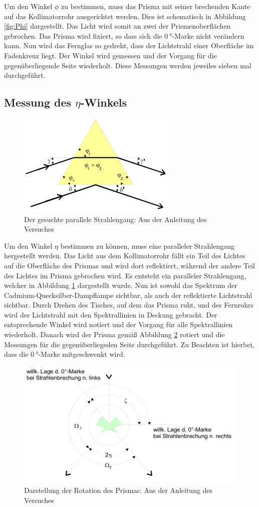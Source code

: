 Um den Winkel $\phi$ zu bestimmen, muss das Prisma mit seiner brechenden Kante auf das Kollimatorrohr ausgerichtet werden.
Dies ist schematisch in Abbildung \ref{fig:Phi} dargestellt.
Das Licht wird somit an zwei der Prismenoberflächen gebrochen.
Das Prisma wird fixiert, so dass sich die $\SI{0}{\degree}$-Marke nicht verändern kann.
Nun wird das Fernglas so gedreht, dass der Lichtstrahl einer Oberfläche im Fadenkreuz liegt.
Der Winkel wird gemessen und der Vorgang für die gegenüberliegende Seite wiederholt.
Diese Messungen werden jeweiles sieben mal durchgeführt.

\subsection{Messung des \texorpdfstring{$\eta$}{eta}-Winkels}

\begin{figure}
  \centering
  \includegraphics[scale=0.6]{images/Eta.png}
  \caption{Der gesuchte parallele Strahlengang: Aus der Anleitung des Versuches \cite[26]{1}}
  \label{fig:Eta}
\end{figure}

Um den Winkel $\eta$ bestimmen zu können, muss eine paralleler Strahlengang hergestellt werden.
Das Licht aus dem Kollimatorrohr fällt ein Teil des Lichtes auf die Oberfläche des Prismas und wird dort reflektiert, während der andere Teil des Lichtes im Prisma gebrochen wird.
Es entsteht ein paralleler Strahlengang, welcher in Abbildung \ref{fig:Eta} dargestellt wurde.
Nun ist sowohl das Spektrum der Cadmium-Quecksilber-Dampflampe sichtbar, als auch der reflektierte Lichtstrahl sichtbar.
Durch Drehen des Tisches, auf dem das Prisma ruht, und des Fernrohrs wird der Lichtstrahl mit den Spektrallinien in Deckung gebracht.
Der entsprechende Winkel wird notiert und der Vorgang für alle Spektrallinien wiederholt.
Danach wird der Prisma gemäß Abbildung \ref{fig:Drehung} rotiert und die Messungen für die gegenüberliegeden Seite durchgeführt.
Zu Beachten ist hierbei, dass die $\SI{0}{\degree}$-Marke mitgeschwenkt wird.

\begin{figure}
  \centering
  \includegraphics[scale=0.6]{images/Drehung.png}
  \caption{Darstellung der Rotation des Prismas: Aus der Anleitung des Versuches \cite[25]{1}}
  \label{fig:Drehung}
\end{figure}
